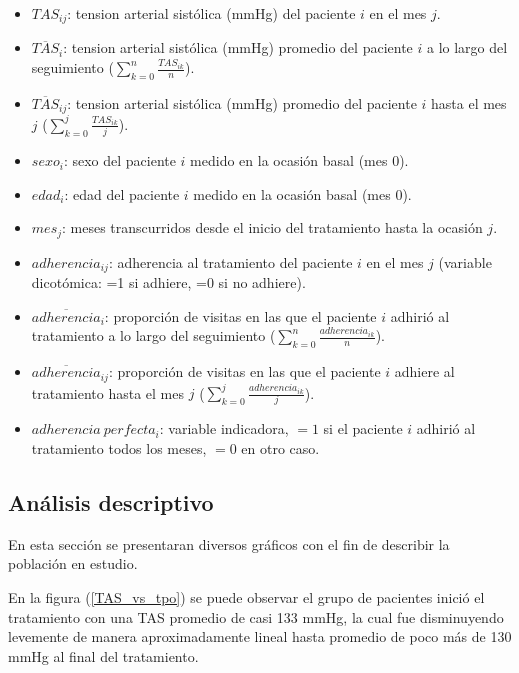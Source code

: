 \documentclass[spanish]{article}
\numberwithin{figure}{subsection}
\numberwithin{equation}{subsection}
\numberwithin{table}{subsection}
\begin{document}
\begin{itemize}
	\item $TAS_{ij}$: tension arterial sistólica (mmHg) del paciente $i$ en el
	mes $j$.
	\item $\overline{TAS}_{i}$: tension arterial sistólica (mmHg) promedio del
	paciente $i$ a lo largo del seguimiento ($\sum_{k=0}^n \frac{TAS_{ik}}{n}$).
	\item $\overline{TAS}_{ij}$: tension arterial sistólica (mmHg) promedio del
	paciente $i$ hasta el mes $j$ ($\sum_{k=0}^j \frac{TAS_{ik}}{j}$).
	\item $sexo_i$: sexo del paciente $i$ medido en la ocasión basal (mes 0).
	\item $edad_i$: edad del paciente $i$ medido en la ocasión basal (mes 0).
	\item $mes_j$: meses transcurridos desde el inicio del tratamiento hasta la
	ocasión $j$.
	\item $adherencia_{ij}$: adherencia al tratamiento del paciente $i$ en el
	mes $j$ (variable dicotómica: =1 si adhiere, =0 si no adhiere).
	\item $\overline{adherencia}_i$: proporción de visitas en las que el
	paciente $i$ adhirió al tratamiento a lo largo del seguimiento
	($\sum_{k=0}^n \frac{adherencia_{ik}}{n}$).
	\item $\overline{adherencia}_{ij}$: proporción de visitas en las que el
	paciente $i$ adhiere al tratamiento hasta el mes $j$ ($\sum_{k=0}^j
	\frac{adherencia_{ik}}{j}$).
	\item $adherencia\ perfecta_i$: variable indicadora, $=1$ si el paciente
	$i$ adhirió al tratamiento todos los meses, $=0$ en otro caso.
\end{itemize}

\subsection{Análisis descriptivo}

En esta sección se presentaran diversos gráficos con el fin de describir la
población en estudio.

En la figura (\ref{TAS_vs_tpo}) se puede observar el grupo de pacientes inició el
tratamiento con una TAS promedio de casi 133 mmHg, la cual fue disminuyendo
levemente de manera aproximadamente lineal hasta promedio de poco más de 130
mmHg al final del tratamiento.
\end{document}
